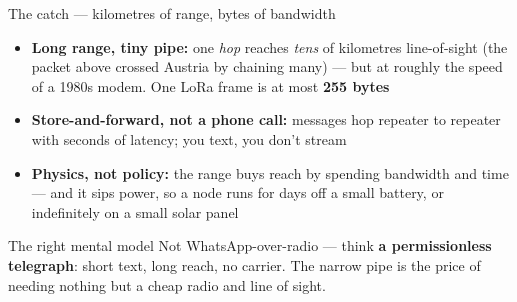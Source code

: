 \documentclass[aspectratio=\baAspect,t,9pt]{beamer}
\begin{document}

\begin{frame}{The catch --- kilometres of range, bytes of bandwidth}
  \begin{itemize}
    \item \textbf{Long range, tiny pipe:} one \emph{hop} reaches \emph{tens} of
      kilometres line-of-sight (the packet above crossed Austria by chaining
      many) --- but at roughly the speed of a 1980s modem. One LoRa frame is at
      most \textbf{255 bytes}
    \item \textbf{Store-and-forward, not a phone call:} messages hop repeater to
      repeater with seconds of latency; you text, you don't stream
    \item \textbf{Physics, not policy:} the range buys reach by spending
      bandwidth and time --- and it sips power, so a node runs for days off a
      small battery, or indefinitely on a small solar panel
  \end{itemize}
  \vfill
  \begin{alertblock}{The right mental model}
    Not WhatsApp-over-radio --- think \textbf{a permissionless telegraph}: short
    text, long reach, no carrier. The narrow pipe is the price of needing nothing
    but a cheap radio and line of sight.
  \end{alertblock}
\end{frame}
\end{document}
